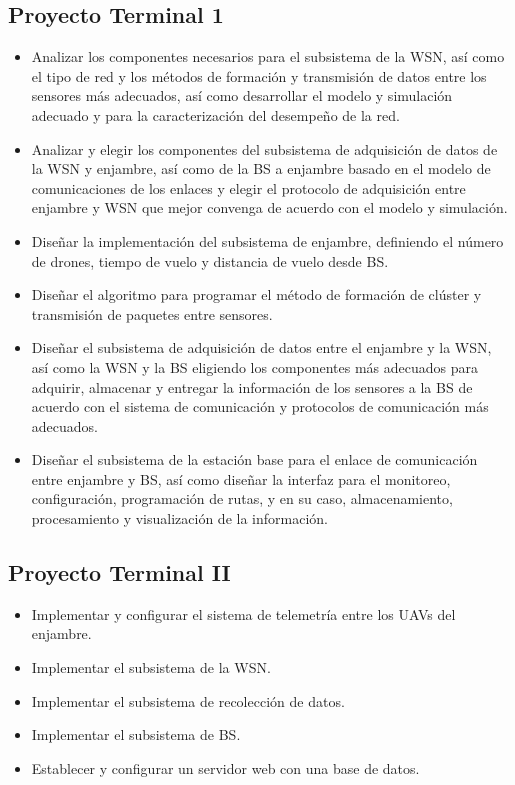\subsection{Proyecto Terminal 1}
\begin{itemize}
    \item Analizar los componentes necesarios para el subsistema de la WSN, así como el tipo de red y los métodos de formación y transmisión de datos entre los sensores más adecuados, así como desarrollar el modelo y simulación adecuado y para la caracterización del desempeño de la red.
    \item Analizar y elegir los componentes del subsistema de adquisición de datos de la WSN y enjambre, así como de la BS a enjambre basado en el modelo de comunicaciones de los enlaces y elegir el protocolo de adquisición entre enjambre y WSN que mejor convenga de acuerdo con el modelo y simulación.
    \item Diseñar la implementación del subsistema de enjambre, definiendo el número de drones, tiempo de vuelo y distancia de vuelo desde BS.
    \item Diseñar el algoritmo para programar el método de formación de clúster y transmisión de paquetes entre sensores.
    \item Diseñar el subsistema de adquisición de datos entre el enjambre y la WSN, así como la WSN y la BS eligiendo los componentes más adecuados para adquirir, almacenar y entregar la información de los sensores a la BS de acuerdo con el sistema de comunicación y protocolos de comunicación más adecuados.
    \item Diseñar el subsistema de la estación base para el enlace de comunicación entre enjambre y BS, así como diseñar la interfaz para el monitoreo, configuración, programación de rutas, y en su caso, almacenamiento, procesamiento y visualización de la información.
\end{itemize}

\subsection{Proyecto Terminal II}
\begin{itemize}
    \item Implementar y configurar el sistema de telemetría entre los UAVs del enjambre.
    \item Implementar el subsistema de la WSN.
    \item Implementar el subsistema de recolección de datos.
    \item Implementar el subsistema de BS.
    \item Establecer y configurar un servidor web con una base de datos.
\end{itemize}

